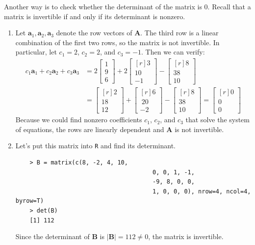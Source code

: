 \documentclass[10pt]{amsart}
\begin{document}
Another way is to check whether the determinant of the matrix is 0. Recall that a matrix is invertible if and only if its determinant is nonzero. 

\begin{enumerate}
	\item Let $\mathbf{a}_1, \mathbf{a}_2, \mathbf{a}_3$ denote the row vectors of $\mathbf{A}$. The third row is a linear combination of the first two rows, so the matrix is not invertible. In particular, let $c_1 = 2$, $c_2 = 2$, and $c_3 = -1$. Then we can verify:
	\begin{align*}
	c_1 \mathbf{a}_1 + c_2 \mathbf{a}_2 + c_3 \mathbf{a}_3 &= 2 \left[\begin{matrix}
	1 \\9 \\6
	\end{matrix}\right] + 2 \left[\begin{matrix*}[r]
	3 \\ 10 \\ -1
	\end{matrix*}\right] - \left[\begin{matrix*}[r]
	8 \\ 38 \\ 10
	\end{matrix*}\right] \\
	&= \left[\begin{matrix*}[r]
	2 \\ 18 \\ 12
	\end{matrix*} \right] + \left[\begin{matrix*}[r]
	6 \\\ 20 \\ -2
	\end{matrix*}\right] - \left[\begin{matrix*}[r]
	8 \\ 38 \\ 10
	\end{matrix*}\right] = \left[\begin{matrix*}[r]
	0\\0\\0
	\end{matrix*}\right]
	\end{align*}
	Because we could find nonzero coefficients $c_1$, $c_2$, and $c_3$ that solve the system of equations, the rows are linearly dependent and $\mathbf{A}$ is not invertible. 
	
	\item Let's put this matrix into \texttt{R} and find its determinant. 
	\begin{verbatim}
	> B = matrix(c(8, -2, 4, 10, 
						               0, 0, 1, -1, 
						               -9, 8, 0, 0, 
						               1, 0, 0, 0), nrow=4, ncol=4, byrow=T)
	> det(B)
	[1] 112
	\end{verbatim}
	Since the determinant of $\mathbf{B}$ is $|\mathbf{B}| = 112 \ne 0$, the matrix is invertible. 
	

\end{enumerate}
\end{document}
